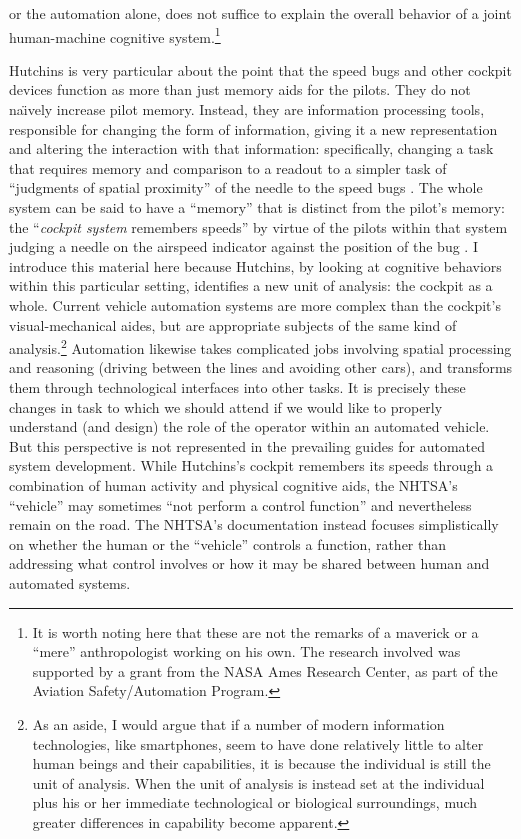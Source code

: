 or the automation alone, does not suffice to explain the overall
behavior of a joint human-machine cognitive system.\footnote{It is
  worth noting here that these are not the remarks of a maverick or a
  ``mere'' anthropologist working on his own. The research involved
  was supported by a grant from the NASA Ames Research Center, as part
  of the Aviation Safety/Automation Program.}

Hutchins is very particular about the point that the speed bugs and
other cockpit devices function as more than just memory aids for the
pilots. They do not na\"{\i}vely increase pilot memory. Instead, they
are information processing tools, responsible for changing the form of
information, giving it a new representation and altering the
interaction with that information: specifically, changing a task that
requires memory and comparison to a readout to a simpler task of
``judgments of spatial proximity'' of the needle to the speed
bugs \cite[p. 282]{hutchinsCockpit}. The whole system can be said to
have a ``memory'' that is distinct from the pilot's memory: the
``\emph{cockpit system} remembers speeds'' by virtue of the pilots
within that system judging a needle on the airspeed indicator against
the position of the bug \cite[p.
  283]{hutchinsCockpit}. I introduce this material here because
Hutchins, by looking at cognitive behaviors within this particular
setting, identifies a new unit of analysis: the cockpit as a whole.
Current vehicle automation systems are more complex than the cockpit's
visual-mechanical aides, but are appropriate subjects of the same kind
of analysis.\footnote{As an aside, I would argue that if a number of
  modern information technologies, like smartphones, seem to have done
relatively little to alter human beings and their capabilities, it is
because the individual 
is still the unit of analysis. When the unit of analysis is instead
set at the individual plus his or her immediate technological or biological
surroundings, much greater differences in capability become apparent.}
Automation likewise takes complicated jobs involving spatial
processing and reasoning (driving between the lines and avoiding other
cars), and transforms them through technological interfaces into other
tasks. It is precisely these changes in task to which we should attend
if we would like to properly understand (and design) the role of the
operator within an automated vehicle. But this perspective is not
represented in the prevailing guides for automated system development.
While Hutchins's cockpit remembers its speeds through a combination of
human activity and physical cognitive aids, the NHTSA's ``vehicle''
may sometimes ``not perform a control function'' \cite[p. 3]{NHTSA} and
nevertheless remain on the road. The NHTSA's documentation instead
focuses simplistically on whether the human or the ``vehicle''
controls a function, rather than addressing what control involves or how it may
be shared between human and automated systems.

